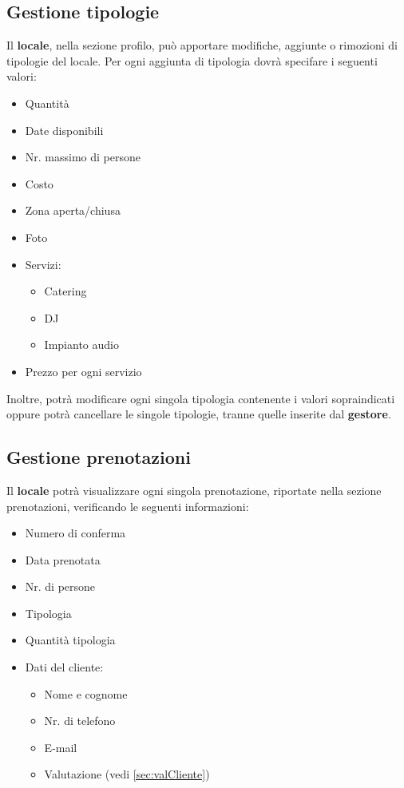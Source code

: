 \subsection{Gestione tipologie} \label{sec:gestTipo}
Il \textbf{locale}, nella sezione profilo, può apportare modifiche, aggiunte o rimozioni di tipologie del locale.
Per ogni aggiunta di tipologia dovrà specifare i seguenti valori:
\begin{itemize}
    \item Quantità
    \item Date disponibili
    \item Nr. massimo di persone
    \item Costo
    \item Zona aperta/chiusa
    \item Foto
    \item Servizi:
    \begin{itemize}
        \item Catering
        \item DJ
        \item Impianto audio
    \end{itemize}
    \item Prezzo per ogni servizio 
    \label{itm:infoLocale}
\end{itemize}
Inoltre, potrà modificare ogni singola tipologia contenente i valori sopraindicati oppure potrà cancellare le singole
tipologie, tranne quelle inserite dal \textbf{gestore}. 

\subsection{Gestione prenotazioni} \label{sec:gestPrenot}
Il \textbf{locale} potrà visualizzare ogni singola prenotazione, riportate nella sezione prenotazioni, verificando le
seguenti informazioni:
\begin{itemize}
    \item Numero di conferma
    \item Data prenotata
    \item Nr. di persone
    \item Tipologia
    \item Quantità tipologia
    \item Dati del cliente:
    \begin{itemize}
        \item Nome e cognome
        \item Nr. di telefono
        \item E-mail
        \item Valutazione (vedi \ref{sec:valCliente})
    \end{itemize}
\end{itemize}

